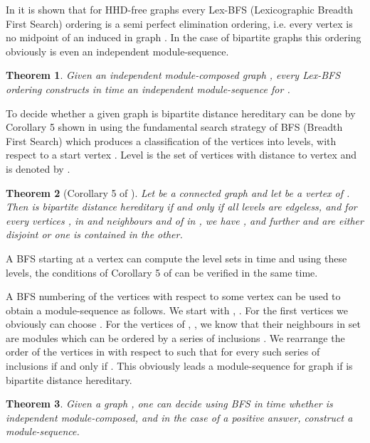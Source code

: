 \documentclass[11pt]{article}
\newtheorem{theorem}{Theorem}[section]
\begin{document}
In \cite{JO88} it is shown that for HHD-free graphs every Lex-BFS (Lexicographic Breadth First Search) 
ordering is a semi perfect elimination ordering, i.e. every vertex  is no midpoint  of an
induced  in graph 
. In the case of bipartite graphs 
this ordering obviously is even an independent module-sequence.

\begin{theorem}
Given an independent module-composed graph , every  Lex-BFS ordering  
constructs in  time  an independent module-sequence for .
\end{theorem}



To decide whether a given graph is bipartite distance hereditary can be
done by Corollary 5 shown in \cite{BM86} using the fundamental search strategy 
of BFS (Breadth First Search) which produces a classification of the vertices into levels, 
with respect to a start vertex . Level  is the set of vertices
with distance  to vertex  and is denoted by .



\begin{theorem}[Corollary 5 of \cite{BM86}]
Let  be a connected graph and let  be a vertex of . Then 
is bipartite distance hereditary if and only if all levels 
are edgeless, and for every vertices , in  and neighbours
 and  of  in , we have ,
and further  and  are either disjoint
or one is contained in the other.
\end{theorem}



A BFS starting at a vertex  can compute the level sets  
in time  and using these levels,
the conditions of Corollary 5 of \cite{BM86} can be verified in the same time.

A BFS numbering  of the vertices with respect to some
vertex  can be used to obtain a
module-sequence  as follows. We start with , .
For the first  vertices we obviously 
can choose . For the vertices of , ,
we know that their neighbours in set  are modules which can be ordered
by a series of inclusions . We rearrange the order of 
the vertices in  with respect to  such that for every such series of inclusions 
 if and only if .
This obviously leads a module-sequence for graph  if  is bipartite distance hereditary.




\begin{theorem}
Given a graph , one can decide using  BFS in time  whether
 is independent module-composed, and in the case of a positive answer, 
construct a module-sequence.
\end{theorem}
\end{document}
